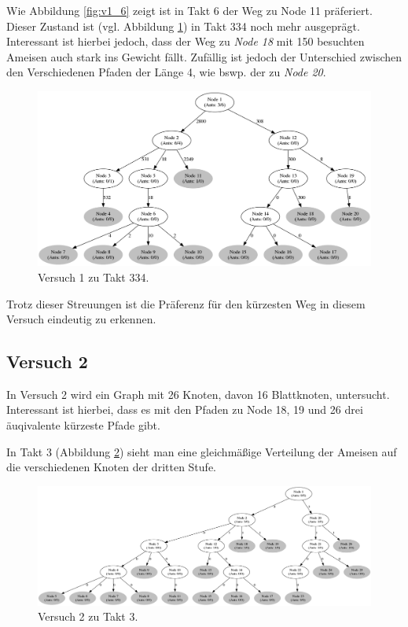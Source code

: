 Wie Abbildung \ref{fig:v1_6} zeigt ist in Takt 6 der Weg zu Node 11 präferiert.
Dieser Zustand ist (vgl. Abbildung \ref{fig:v1_334}) in Takt 334 noch mehr ausgeprägt. Interessant ist hierbei jedoch, dass der Weg zu \emph{Node 18} mit 150 besuchten Ameisen auch stark ins Gewicht fällt. Zufällig ist jedoch der Unterschied zwischen den Verschiedenen Pfaden der Länge 4, wie bswp. der zu \emph{Node 20}.
\begin{figure}[htbp]
	\includegraphics[width=.9\textwidth]{images/v1_334.png}
	\caption{Versuch 1 zu Takt 334.}
	\label{fig:v1_334}
\end{figure}
Trotz dieser Streuungen ist die Präferenz für den kürzesten Weg in diesem Versuch eindeutig zu erkennen.

\subsection{Versuch 2}
In Versuch 2 wird ein Graph mit 26 Knoten, davon 16 Blattknoten, untersucht.
Interessant ist hierbei, dass es mit den Pfaden zu Node 18, 19 und 26 drei äuqivalente kürzeste Pfade gibt.\par
In Takt 3 (Abbildung \ref{fig:v2_3}) sieht man eine gleichmäßige Verteilung der Ameisen auf die verschiedenen Knoten der dritten Stufe. 

\begin{figure}[htbp]
	\includegraphics[width=.9\textwidth]{images/v2_3.png}
	\caption{Versuch 2 zu Takt 3.}
	\label{fig:v2_3}
\end{figure}

